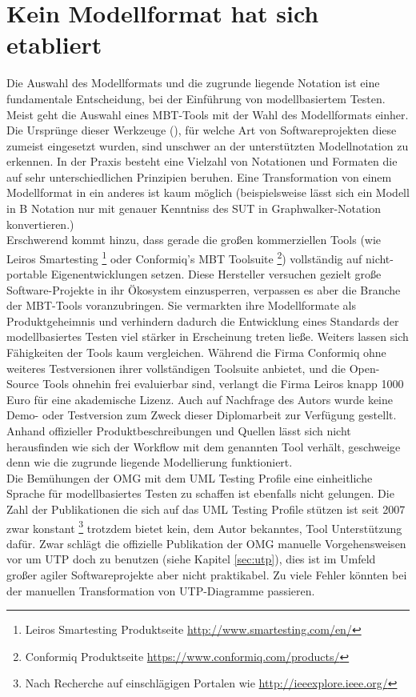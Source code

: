 \section{Kein Modellformat hat sich etabliert}
\label{sec:discussion_format}
Die Auswahl des Modellformats und die zugrunde liegende Notation ist eine fundamentale Entscheidung, bei der Einführung von modellbasiertem Testen. Meist geht die Auswahl eines MBT-Tools mit der Wahl des Modellformats einher. Die Ursprünge dieser Werkzeuge (), für welche Art von Softwareprojekten diese zumeist eingesetzt wurden, sind unschwer an der unterstützten Modellnotation zu erkennen.  In der Praxis besteht eine Vielzahl von Notationen und Formaten die auf sehr unterschiedlichen Prinzipien beruhen. Eine Transformation von einem Modellformat in ein anderes ist kaum möglich (beispielsweise lässt sich ein Modell in B Notation nur mit genauer Kenntniss des SUT in Graphwalker-Notation konvertieren.)\\
Erschwerend kommt hinzu, dass gerade die großen kommerziellen Tools (wie Leiros Smartesting \footnote{Leiros Smartesting Produktseite \url{http://www.smartesting.com/en/}} oder Conformiq's MBT Toolsuite \footnote{Conformiq Produktseite \url{https://www.conformiq.com/products/}}) vollständig auf nicht-portable Eigenentwicklungen setzen. Diese Hersteller versuchen gezielt große Software-Projekte in ihr Ökosystem einzusperren, verpassen es aber die Branche der MBT-Tools voranzubringen. Sie vermarkten ihre Modellformate als Produktgeheimnis und verhindern dadurch die Entwicklung eines Standards der modellbasiertes Testen viel stärker in Erscheinung treten ließe. Weiters lassen sich Fähigkeiten der Tools kaum vergleichen. Während die Firma Conformiq ohne weiteres Testversionen ihrer vollständigen Toolsuite anbietet, und die Open-Source Tools ohnehin frei evaluierbar sind, verlangt die Firma Leiros knapp 1000 Euro für eine akademische Lizenz. Auch auf Nachfrage des Autors wurde keine Demo- oder Testversion zum Zweck dieser Diplomarbeit zur Verfügung gestellt. Anhand offizieller Produktbeschreibungen und Quellen lässt sich nicht herausfinden wie sich der Workflow mit dem genannten Tool verhält, geschweige denn wie die zugrunde liegende Modellierung funktioniert.\\
Die Bemühungen der OMG mit dem UML Testing Profile eine einheitliche Sprache für modellbasiertes Testen zu schaffen ist ebenfalls nicht gelungen. Die Zahl der Publikationen die sich auf das UML Testing Profile stützen ist seit 2007 zwar konstant \footnote{Nach Recherche auf einschlägigen Portalen wie \url{http://ieeexplore.ieee.org/}} trotzdem bietet kein, dem Autor bekanntes, Tool Unterstützung dafür. Zwar schlägt die offizielle Publikation der OMG\cite{_model-driven_2007} manuelle Vorgehensweisen vor um UTP doch zu benutzen (siehe Kapitel \ref{sec:utp}), dies ist im Umfeld großer agiler Softwareprojekte aber nicht praktikabel. Zu viele Fehler könnten bei der manuellen Transformation von UTP-Diagramme passieren.\\
